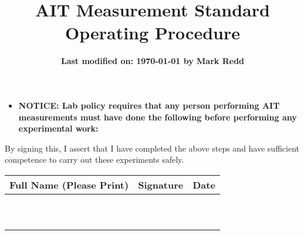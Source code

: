 \documentclass{article}
\title{\textbf{AIT Measurement Standard Operating Procedure}}
\date{\textbf{Last modified on: \today \hspace{1mm} by Mark Redd}}
\begin{document}
\maketitle

\begin{itemize}
\item \textbf{NOTICE: Lab policy requires that any person performing 
    AIT measurements must have done the following before performing any 
    experimental work:}
    
\end{itemize}

By signing this, I assert that I have completed the above steps and have 
sufficient competence to carry out these experiments safely. 
\begin{center}
\begin{tabu} to 0.9\textwidth {X[c]|X[c]|X[c]}
 Full Name (Please Print) & Signature & Date  \\ 
 \hline
 \vspace{5mm} & & \\ \hline 
 \vspace{5mm} & & \\ \hline 
 \vspace{5mm} & & \\ \hline 
 \vspace{5mm} & & \\ \hline 
 \vspace{5mm} & & \\ \hline 
 \vspace{5mm} & & \\ \hline 
 \vspace{5mm} & & \\ \hline 
 \vspace{5mm} & & \\ \hline 
 \vspace{5mm} & & \\ \hline 
 \vspace{5mm} & & \\ \hline 

 
\end{tabu}
\end{center}
\end{document}
